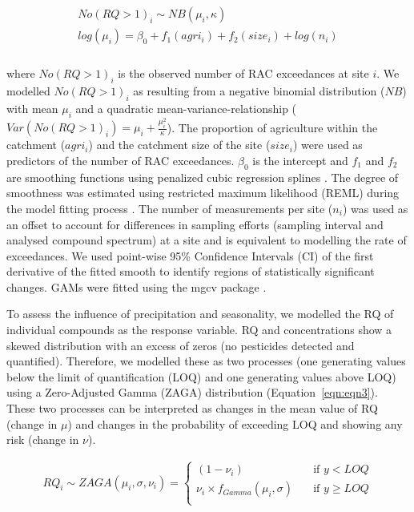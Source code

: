\begin{align}
\begin{split}
  No(RQ > 1)_i \sim NB(\mu_i, \kappa) \\
  log(\mu_i)= \beta_0 + f_1(agri_i) + f_2(size_i) + log(n_i) \\
\end{split}
\end{align}

where $No(RQ > 1)_i$ is the observed number of RAC exceedances at site $i$. 
We modelled $No(RQ > 1)_i$ as resulting from a negative binomial distribution ($NB$) with mean $\mu_i$ and a quadratic mean-variance-relationship ($Var(No(RQ > 1)_i) = \mu_i + \frac{\mu_i^2}{\kappa}$).
The proportion of agriculture within the catchment ($agri_i$) and the catchment size of the site ($size_i$) were used as predictors of the number of RAC exceedances. 
$\beta_0$ is the intercept and $f_1$ and $f_2$ are smoothing functions using penalized cubic regression splines \citep{wood_generalized_2006}. 
The degree of smoothness was estimated using restricted maximum likelihood (REML) during the model fitting process \citep{wood_fast_2011}.
The number of measurements per site ($n_i$) was used as an offset to account for differences in sampling efforts (sampling interval and analysed compound spectrum) at a site and is equivalent to modelling the rate of exceedances. 
We used point-wise 95\% Confidence Intervals (CI) of the first derivative of the fitted smooth to identify regions of statistically significant changes.
GAMs were fitted using the mgcv package \citep{wood_fast_2011}.

To assess the influence of precipitation and seasonality, we modelled the RQ of individual compounds as the response variable.
RQ and concentrations show a skewed distribution with an excess of zeros (no pesticides detected and quantified). 
Therefore, we modelled these as two processes (one generating values below the limit of quantification (LOQ) and one generating values above LOQ) using a Zero-Adjusted Gamma (ZAGA) distribution \citep{rigby_generalized_2005,stasinopoulos_gamlss.dist:_2016} (Equation~\ref{eqn:eqn3}).
These two processes can be interpreted as changes in the mean value of RQ (change in $\mu$) and changes in the probability of exceeding LOQ and showing any risk (change in $\nu$).

\begin{align}
RQ_i \sim ZAGA(\mu_i, \sigma, \nu_i) = 
  \begin{cases}
    (1 - \nu_i)   & \quad  \text{if } y < LOQ \\
    \nu_i \times f_{Gamma} (\mu_i, \sigma) & \quad \text{if } y \ge LOQ \\
  \end{cases}
  \label{eqn:eqn3}
\end{align}

